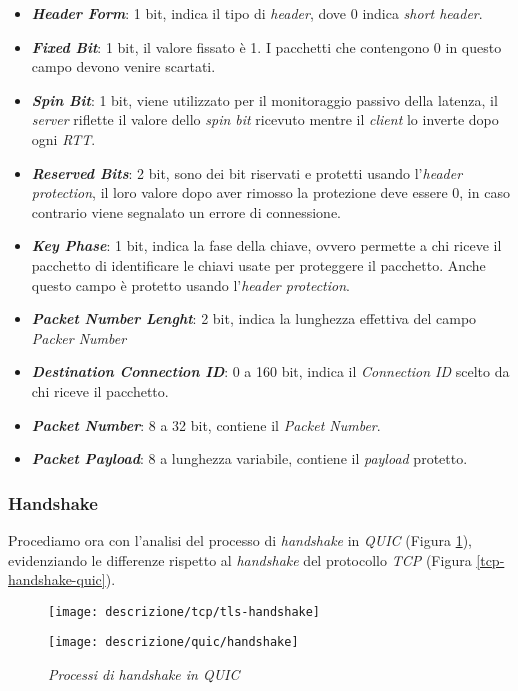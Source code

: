 \begin{itemize}
    \item \textit{\textbf{Header Form}}: 1 bit, indica il tipo di \emph{header}, dove 0 indica \emph{short header}.
    \item \textit{\textbf{Fixed Bit}}: 1 bit, il valore fissato è 1. I pacchetti che contengono 0 in questo campo devono venire scartati.
    \item \textit{\textbf{Spin Bit}}: 1 bit, viene utilizzato per il monitoraggio passivo della latenza, il \emph{server} riflette il valore dello \emph{spin bit} ricevuto mentre il \emph{client} lo inverte dopo ogni \emph{RTT}.
    \item \textit{\textbf{Reserved Bits}}: 2 bit, sono dei bit riservati e protetti usando l'\emph{header protection}, il loro valore dopo aver rimosso la protezione deve essere 0, in caso contrario viene segnalato un errore di connessione.
    \item \textit{\textbf{Key Phase}}: 1 bit, indica la fase della chiave, ovvero permette a chi riceve il pacchetto di identificare le chiavi usate per proteggere il pacchetto. Anche questo campo è protetto usando l'\emph{header protection}.
    \item \textit{\textbf{Packet Number Lenght}}: 2 bit, indica la lunghezza effettiva del campo \emph{Packer Number}
    \item \textit{\textbf{Destination Connection ID}}: 0 a 160 bit, indica il \emph{Connection ID} scelto da chi riceve il pacchetto.
    \item \textit{\textbf{Packet Number}}: 8 a 32 bit, contiene il \emph{Packet Number}.
    \item \textit{\textbf{Packet Payload}}: 8 a lunghezza variabile, contiene il \emph{payload} protetto. 
    \end{itemize}
\subsubsection{Handshake}
Procediamo ora con l'analisi del processo di \emph{handshake} in \emph{QUIC} (Figura \ref{quic-handshake-quic}), evidenziando le differenze rispetto al \emph{handshake} del protocollo \emph{TCP} (Figura \ref{tcp-handshake-quic}).
\begin{figure}[!h]
    \centering
    \begin{minipage}{0.48\textwidth}
        \centering
        \texttt{[image: descrizione/tcp/tls-handshake]}
        \caption{\emph{Processo three-way handshake in TCP con TLS 1.3}}
        \label{tcp-handshake-quic}
    \end{minipage}
    \hfill
    \begin{minipage}{0.48\textwidth}
        \centering
        \texttt{[image: descrizione/quic/handshake]}
        \caption{\emph{Processi di handshake in QUIC}}
        \label{quic-handshake-quic}
    \end{minipage}
\end{figure}


